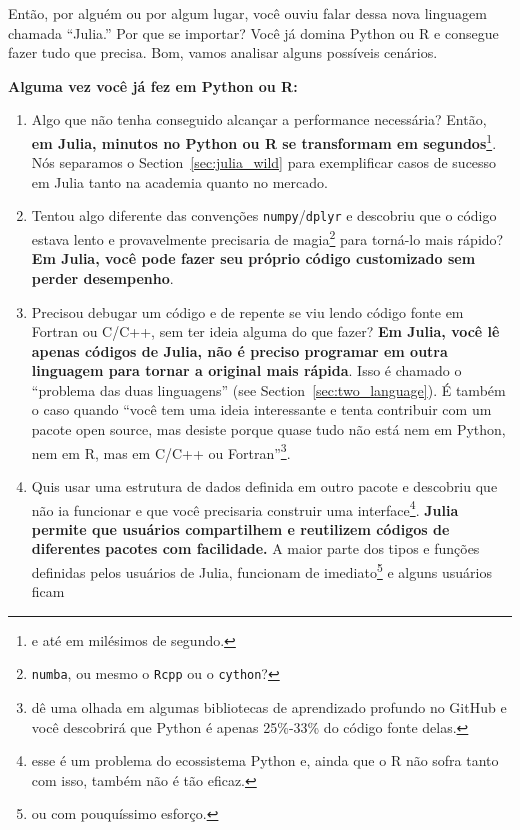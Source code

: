 \documentclass[
  notoc %
]{tufte-book}
\newcommand{\passthrough}[1]{#1}
\begin{document}
Então, por alguém ou por algum lugar, você ouviu falar dessa nova
linguagem chamada ``Julia.'' Por que se importar? Você já domina Python
ou R e consegue fazer tudo que precisa. Bom, vamos analisar alguns
possíveis cenários.

\textbf{Alguma vez você já fez em Python ou R:}

\begin{enumerate}
\def\labelenumi{\arabic{enumi}.}
\item
  Algo que não tenha conseguido alcançar a performance necessária?
  Então, \textbf{em Julia, minutos no Python ou R se transformam em
  segundos}\footnote{e até em milésimos de segundo.}. Nós separamos o
  Section~\ref{sec:julia_wild} para exemplificar casos de sucesso em
  Julia tanto na academia quanto no mercado.
\item
  Tentou algo diferente das convenções
  \passthrough{\lstinline!numpy!}/\passthrough{\lstinline!dplyr!} e
  descobriu que o código estava lento e provavelmente precisaria de
  magia\footnote{\passthrough{\lstinline!numba!}, ou mesmo o
    \passthrough{\lstinline!Rcpp!} ou o
    \passthrough{\lstinline!cython!}?} para torná-lo mais rápido?
  \textbf{Em Julia, você pode fazer seu próprio código customizado sem
  perder desempenho}.
\item
  Precisou debugar um código e de repente se viu lendo código fonte em
  Fortran ou C/C++, sem ter ideia alguma do que fazer? \textbf{Em Julia,
  você lê apenas códigos de Julia, não é preciso programar em outra
  linguagem para tornar a original mais rápida}. Isso é chamado o
  ``problema das duas linguagens'' (see Section~\ref{sec:two_language}).
  É também o caso quando ``você tem uma ideia interessante e tenta
  contribuir com um pacote open source, mas desiste porque quase tudo
  não está nem em Python, nem em R, mas em C/C++ ou
  Fortran''\footnote{dê uma olhada em algumas bibliotecas de aprendizado
    profundo no GitHub e você descobrirá que Python é apenas 25\%-33\%
    do código fonte delas.}.
\item
  Quis usar uma estrutura de dados definida em outro pacote e descobriu
  que não ia funcionar e que você precisaria construir uma
  interface\footnote{esse é um problema do ecossistema Python e, ainda
    que o R não sofra tanto com isso, também não é tão eficaz.}.
  \textbf{Julia permite que usuários compartilhem e reutilizem códigos
  de diferentes pacotes com facilidade.} A maior parte dos tipos e
  funções definidas pelos usuários de Julia, funcionam de
  imediato\footnote{ou com pouquíssimo esforço.} e alguns usuários ficam

\end{enumerate}
\end{document}
